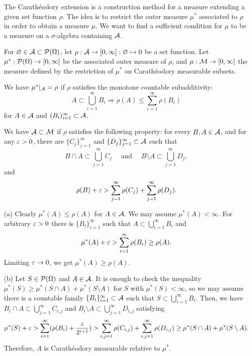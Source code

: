 \documentclass{../note}
\begin{document}
\begin{prb}
The Carath\'eodory extension is a construction method for a measure extending a given set function $\rho$.
The idea is to restrict the outer measure $\mu^*$ associated to $\rho$ in order to obtain a measure $\mu$.
We want to find a sufficient condition for $\mu$ to be a measure on a $\sigma$-algebra containing $\mathcal{A}$.

For $\varnothing\in\mathcal{A}\subset\mathcal{P}(\Omega)$, let $\rho:\mathcal{A}\to[0,\infty]:\varnothing\mapsto0$ be a set function.
Let $\mu^*:\mathcal{P}(\Omega)\to[0,\infty]$ be the associated outer measure of $\rho$, and $\mu:\mathcal{M}\to[0,\infty]$ the measure defined by the restriction of $\mu^*$ on Carath\'eodory measurable subsets.
\begin{parts}
\item We have $\mu^*|_{\mathcal{A}}=\rho$ if $\rho$ satisfies the monotone countable subadditivity:
\[A\subset\bigcup_{i=1}^\infty B_i\Rightarrow\rho(A)\le\sum_{i=1}^\infty\rho(B_i)\]
for $A\in\mathcal{A}$ and $(B_i)_{i=1}^\infty\subset\mathcal{A}$.
\item We have $\mathcal{A}\subset\mathcal{M}$ if $\rho$ satisfies the following property: for every $B,A\in\mathcal{A}$, and for any $\varepsilon>0$, there are $\{C_j\}_{j=1}^\infty$ and $\{D_j\}_{j=1}^\infty\subset\mathcal{A}$ such that
\[B\cap A\subset\bigcup_{j=1}^\infty C_j\quad\text{ and }\quad B\setminus A\subset\bigcup_{j=1}^\infty D_j,\]
and
\[\rho(B)+\varepsilon>\sum_{j=1}^\infty\rho(C_j)+\sum_{j=1}^\infty\rho(D_j).\]
\end{parts}
\end{prb}
\begin{pf}
(a)
Clearly $\mu^*(A)\le\rho(A)$ for $A\in\mathcal{A}$.
We may assume $\mu^*(A)<\infty$.
For arbitrary $\varepsilon>0$ there is $\{B_i\}_{i=1}^\infty$ such that $A\subset\bigcup_{i=1}^\infty B_i$ and
\[\mu^*(A)+\varepsilon>\sum_{i=1}^\infty\rho(B_i)\ge\rho(A).\]
Limiting $\varepsilon\to0$, we get $\mu^*(A)\ge\rho(A)$.

(b)
Let $S\in\mathcal{P}(\Omega)$ and $A\in\mathcal{A}$.
It is enough to check the inequality $\mu^*(S)\ge\mu^*(S\cap A)+\mu^*(S\setminus A)$ for $S$ with $\mu^*(S)<\infty$, so we may assume there is a countable family $\{B_i\}_{i=1}^\infty\subset\mathcal{A}$ such that $S\subset\bigcup_{i=1}^\infty B_i$.
Then, we have $B_i\cap A\subset\bigcup_{j=1}^\infty C_{i,j}$ and $B_i\setminus A\subset\bigcup_{j=1}^\infty D_{i,j}$ satisfying
\[\mu^*(S)+\varepsilon>\sum_{i=1}^\infty(\rho(B_i)+\frac{\varepsilon}{2^{i+1}})
>\sum_{i,j=1}^\infty\rho(C_{i,j})+\sum_{i,j=1}^\infty\rho(D_{i,j})\ge\mu^*(S\cap A)+\mu^*(S\setminus A).\]
Therefore, $A$ is Carath\'eodory measurable relative to $\mu^*$.
\end{pf}
\end{document}
